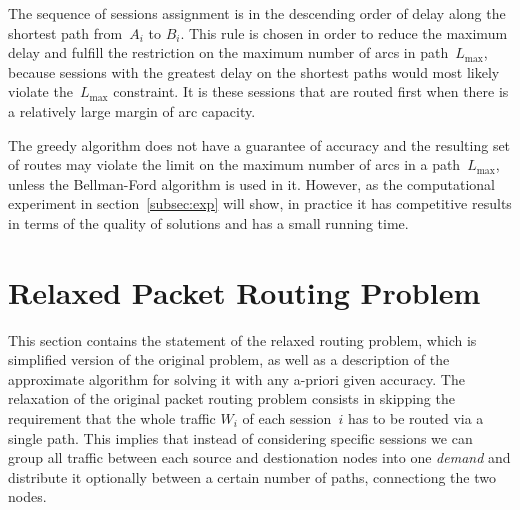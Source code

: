 \documentclass{ifacconf}
\begin{document}
The sequence of sessions assignment is in the descending order of
delay along the shortest path from~$A_i$ to $B_i$. This rule is chosen
in order to reduce the maximum delay and
fulfill the restriction on the maximum number of arcs in
path~$L_{\max}$, because sessions with the greatest delay on the shortest
paths would most likely violate the~$L_{\max}$ constraint.
It is these sessions that are routed first when there is
a relatively large margin of arc capacity.

The greedy algorithm does not have a guarantee of accuracy and the resulting set of
routes may violate the limit on the maximum number of arcs in a path~$L_{\max}$, unless the Bellman-Ford algorithm is used in it.
However, as the computational experiment in
section~\ref{subsec:exp} will show, in practice it has
competitive results in terms of the quality of solutions and has a small
running time.

\section{Relaxed Packet Routing Problem} \label{formulation}

This section contains the statement of the relaxed routing problem, which is
simplified version of the original problem, as well as a description of the approximate
algorithm for solving it with any a-priori given accuracy. The relaxation of the original packet routing problem consists in
skipping the requirement that the whole traffic $W_i$ of each
session~$i$ has to be routed via a single path. This implies
that instead of considering specific sessions we can group
all traffic between each source and destionation nodes into
one {\em demand} and distribute it optionally between a certain
number of paths, connectiong the two nodes.
\end{document}
